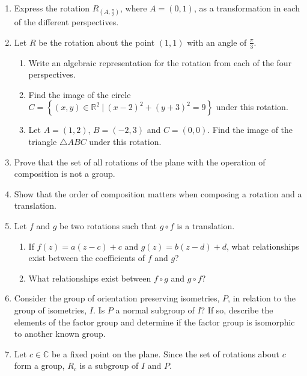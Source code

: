 \documentclass[
]{book}
\providecommand{\tightlist}{%
  \setlength{\itemsep}{0pt}\setlength{\parskip}{0pt}}
\theoremstyle{definition}
\theoremstyle{definition}
\theoremstyle{definition}
\theoremstyle{definition}
\theoremstyle{remark}
\begin{document}
\begin{enumerate}
\def\labelenumi{\arabic{enumi}.}
\item
  Express the rotation \(R_{(A,\frac{\pi}{2})}\), where \(A=(0,1)\), as a transformation in each of the different perspectives.
\item
  Let \(R\) be the rotation about the point \((1,1)\) with an angle of \(\frac{\pi}{3}\).

  \begin{enumerate}
  \def\labelenumii{\alph{enumii}.}
  \tightlist
  \item
    Write an algebraic representation for the rotation from each of the four perspectives.
  \item
    Find the image of the circle \(C=\left\{ (x,y)\in \mathbb{R}^2 \: \vert \: (x-2)^2+(y+3)^2 =9\right\}\) under this rotation.
  \item
    Let \(A=(1,2)\), \(B=(-2,3)\) and \(C=(0,0)\). Find the image of the triangle \(\triangle ABC\) under this rotation.
  \end{enumerate}
\item
  Prove that the set of all rotations of the plane with the operation of composition is not a group.
\item
  Show that the order of composition matters when composing a rotation and a translation.
\item
  Let \(f\) and \(g\) be two rotations such that \(g\circ f\) is a translation.

  \begin{enumerate}
  \def\labelenumii{\alph{enumii}.}
  \tightlist
  \item
    If \(f(z)=a(z-c)+c\) and \(g(z)=b(z-d)+d\), what relationships exist between the coefficients of \(f\) and \(g\)?
  \item
    What relationships exist between \(f\circ g\) and \(g\circ f\)?
  \end{enumerate}
\item
  Consider the group of orientation preserving isometries, \(P\), in relation to the group of isometries, \(I\). Is \(P\) a normal subgroup of \(I\)? If so, describe the elements of the factor group and determine if the factor group is isomorphic to another known group.
\item
  Let \(c\in \mathbb{C}\) be a fixed point on the plane. Since the set of rotations about \(c\) form a group, \(R_c\) is a subgroup of \(I\) and \(P\).


\end{enumerate}
\end{document}
